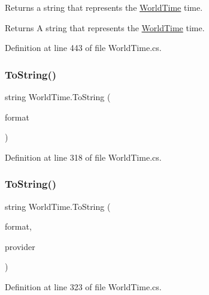 Returns a string that represents the \hyperlink{struct_world_time}{World\+Time} time. 

\begin{DoxyReturn}{Returns}
A string that represents the \hyperlink{struct_world_time}{World\+Time} time.
\end{DoxyReturn}


Definition at line 443 of file World\+Time.\+cs.

\mbox{\label{struct_world_time_ae1539be853ff4914487e4f8aa8f74fd2}} 
\subsubsection{\texorpdfstring{To\+String()}{ToString()}\hspace{0.1cm}{\footnotesize\ttfamily [1/4]}}
{\footnotesize\ttfamily string World\+Time.\+To\+String (\begin{DoxyParamCaption}\item[{string}]{format }\end{DoxyParamCaption})}



Definition at line 318 of file World\+Time.\+cs.

\mbox{\label{struct_world_time_a5ea34c4e7f7d313b18a0a4d919c717df}} 
\subsubsection{\texorpdfstring{To\+String()}{ToString()}\hspace{0.1cm}{\footnotesize\ttfamily [2/4]}}
{\footnotesize\ttfamily string World\+Time.\+To\+String (\begin{DoxyParamCaption}\item[{string}]{format,  }\item[{I\+Format\+Provider}]{provider }\end{DoxyParamCaption})}



Definition at line 323 of file World\+Time.\+cs.

\mbox{\label{struct_world_time_a01674520b36112e2efb356198266dd40}} 
